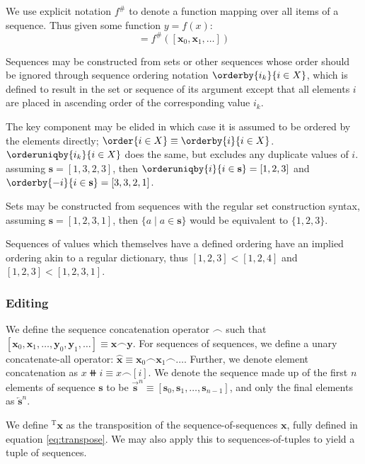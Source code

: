 We use explicit notation $f^{\#}$ to denote a function mapping over all items of a sequence. Thus given some function $y = f(x)$:
\begin{equation}
  [f(\mathbf{x}_0), f(\mathbf{x}_1), \dots] = f^{\#}([\mathbf{x}_0, \mathbf{x}_1, \dots])
\end{equation}

Sequences may be constructed from sets or other sequences whose order should be ignored through sequence ordering notation $\orderby{i_k}{i \in X}$, which is defined to result in the set or sequence of its argument except that all elements $i$ are placed in ascending order of the corresponding value $i_k$.

The key component may be elided in which case it is assumed to be ordered by the elements directly; \ie $\order{i \in X} \equiv \orderby{i}{i \in X}$. $\orderuniqby{i_k}{i \in X}$ does the same, but excludes any duplicate values of $i$. \Eg assuming $\mathbf{s} = [1, 3, 2, 3]$, then $\orderuniqby{i}{i \in \mathbf{s}} = [ 1, 2, 3 ]$ and $\orderby{-i}{i \in \mathbf{s}} = [ 3, 3, 2, 1 ]$.

Sets may be constructed from sequences with the regular set construction syntax, \eg assuming $\mathbf{s} = [1, 2, 3, 1]$, then $\{ a \mid a \in \mathbf{s} \}$ would be equivalent to $\{ 1, 2, 3 \}$.

Sequences of values which themselves have a defined ordering have an implied ordering akin to a regular dictionary, thus $[1, 2, 3] < [1, 2, 4]$ and $[1, 2, 3] < [1, 2, 3, 1]$.

\subsubsection{Editing}
We define the sequence concatenation operator $\frown$ such that $[\mathbf{x}_0, \mathbf{x}_1, \dots, \mathbf{y}_0, \mathbf{y}_1, \dots] \equiv \mathbf{x} \frown \mathbf{y}$. For sequences of sequences, we define a unary concatenate-all operator: $\wideparen{\mathbf{x}}\equiv\mathbf{x}_0 \frown \mathbf{x}_1 \frown \dots$. Further, we denote element concatenation as $x \doubleplus i \equiv x \frown [i]$. We denote the sequence made up of the first $n$ elements of sequence $\mathbf{s}$ to be ${\overrightarrow{\mathbf{s}}}^n \equiv [\mathbf{s}_0, \mathbf{s}_1, \dots, \mathbf{s}_{n-1}]$, and only the final elements as ${\overleftarrow{\mathbf{s}}}^n$.

We define ${}^\text{T}\mathbf{x}$ as the transposition of the sequence-of-sequences $\mathbf{x}$, fully defined in equation \ref{eq:transpose}. We may also apply this to sequences-of-tuples to yield a tuple of sequences.

